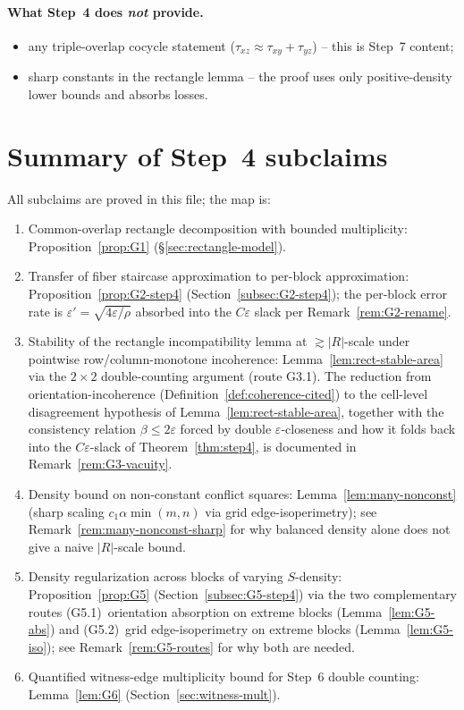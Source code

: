 \paragraph{What Step~4 does \emph{not} provide.}
\begin{itemize}
\item any triple-overlap cocycle statement
($\tau_{xz}\approx\tau_{xy}+\tau_{yz}$) -- this is Step~7 content;
\item sharp constants in the rectangle lemma -- the proof uses only
positive-density lower bounds and absorbs losses.
\end{itemize}

\section{Summary of Step~4 subclaims}
\label{sec:gap-summary}

All subclaims are proved in this file; the map is:
\begin{enumerate}[label=\textbf{G\arabic*.}]
\item Common-overlap rectangle decomposition with bounded multiplicity:
Proposition~\ref{prop:G1} (\S\ref{sec:rectangle-model}).
\item Transfer of fiber staircase approximation to per-block
approximation: Proposition~\ref{prop:G2-step4}
(Section~\ref{subsec:G2-step4}); the per-block error rate is
$\varepsilon'=\sqrt{4\varepsilon/\rho}$ absorbed into the
$C\varepsilon$ slack per Remark~\ref{rem:G2-rename}.
\item Stability of the rectangle incompatibility lemma at
$\gtrsim|R|$-scale under pointwise row/column-monotone incoherence:
Lemma~\ref{lem:rect-stable-area} via the $2\times2$ double-counting
argument (route G3.1). The reduction from orientation-incoherence
(Definition~\ref{def:coherence-cited}) to the cell-level disagreement
hypothesis of Lemma~\ref{lem:rect-stable-area}, together with the
consistency relation $\beta\le2\varepsilon$ forced by double
$\varepsilon$-closeness and how it folds back into the
$C\varepsilon$-slack of Theorem~\ref{thm:step4}, is documented in
Remark~\ref{rem:G3-vacuity}.
\item Density bound on non-constant conflict squares:
Lemma~\ref{lem:many-nonconst} (sharp scaling $c_1\alpha\min(m,n)$ via
grid edge-isoperimetry); see Remark~\ref{rem:many-nonconst-sharp} for
why balanced density alone does not give a naive $|R|$-scale bound.
\item Density regularization across blocks of varying $S$-density:
Proposition~\ref{prop:G5} (Section~\ref{subsec:G5-step4}) via the two
complementary routes (G5.1)~orientation absorption on extreme blocks
(Lemma~\ref{lem:G5-abs}) and (G5.2)~grid edge-isoperimetry on extreme
blocks (Lemma~\ref{lem:G5-iso}); see Remark~\ref{rem:G5-routes} for
why both are needed.
\item Quantified witness-edge multiplicity bound for Step~6
double counting: Lemma~\ref{lem:G6} (Section~\ref{sec:witness-mult}).
\end{enumerate}


